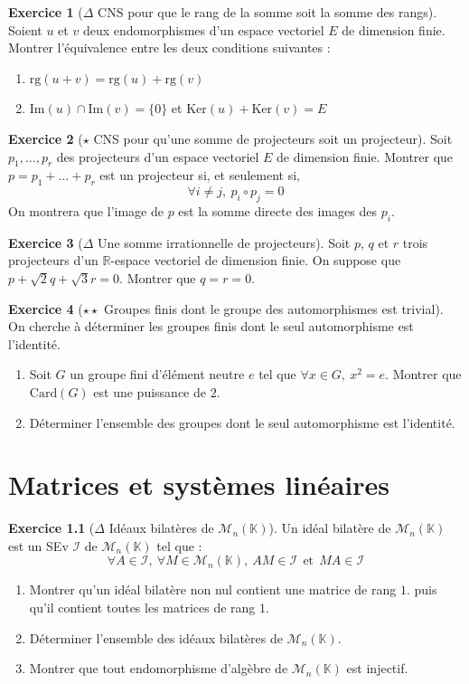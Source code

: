 \documentclass[french]{book}
\newcommand{\R}{\mathbb{R}}
\newcommand{\K}{\mathbb{K}}
\renewcommand{\ker}{\text{Ker}}
\newcommand{\im}{\text{Im}}
\newcommand{\card}{\text{Card}}
\theoremstyle{definition}
\newtheorem{ex}{Exercice}[chapter]
\theoremstyle{theorem}
\theoremstyle{remark}
\begin{document}
\begin{ex}[$\Delta$ CNS pour que le rang de la somme soit la somme des rangs]
	Soient $u$ et $v$ deux endomorphismes d'un espace vectoriel $E$ de dimension finie. Montrer l'équivalence entre les deux conditions suivantes :
	\begin{enumerate}
		\item $\text{rg}(u+v)=\text{rg}(u)+\text{rg}(v)$
		\item $\im(u)\cap\im(v)=\{0\}$ et $\ker(u)+\ker(v)=E$
	\end{enumerate}
\end{ex}

\begin{ex}[$\star$ CNS pour qu'une somme de projecteurs soit un projecteur]
	Soit $p_1,\ldots,p_r$ des projecteurs d'un espace vectoriel $E$ de dimension finie. Montrer que $p=p_1+\ldots+p_r$ est un projecteur si, et seulement si, $$\forall i\ne j,\ p_i\circ p_j=0$$ On montrera que l'image de $p$ est la somme directe des images des $p_i$.
\end{ex}

\begin{ex}[$\Delta$ Une somme irrationnelle de projecteurs]
	Soit $p$, $q$ et $r$ trois projecteurs d'un $\R$-espace vectoriel de dimension finie. On suppose que $p+\sqrt{2}q+\sqrt{3}r=0$. Montrer que $q=r=0$.
\end{ex}

\begin{ex}[$\star\star$ Groupes finis dont le groupe des automorphismes est trivial]
	On cherche à déterminer les groupes finis dont le seul automorphisme est l'identité.
	\begin{enumerate}
		\item Soit $G$ un groupe fini d'élément neutre $e$ tel que $\forall x\in G,\ x^2=e$. Montrer que $\card(G)$ est une puissance de $2$.
		\item Déterminer l'ensemble des groupes dont le seul automorphisme est l'identité.
	\end{enumerate}
\end{ex}

\chapter{Matrices et systèmes linéaires}

\begin{ex}[$\Delta$ Idéaux bilatères de $\mathcal{M}_n(\K)$]
	Un idéal bilatère de $\mathcal{M}_n(\K)$ est un SEv $\mathcal{I}$ de $\mathcal{M}_n(\K)$ tel que : $$\forall A\in\mathcal{I},\ \forall M\in\mathcal{M}_n(\K),\ AM\in\mathcal{I} \ \ \text{et} \ \ MA\in\mathcal{I}$$
	\begin{enumerate}
		\item Montrer qu'un idéal bilatère non nul contient une matrice de rang $1$. puis qu'il contient toutes les matrices de rang $1$.
		\item Déterminer l'ensemble des idéaux bilatères de $\mathcal{M}_n(\K)$.
		\item Montrer que tout endomorphisme d'algèbre de $\mathcal{M}_n(\K)$ est injectif.
	\end{enumerate}
\end{ex}
\end{document}
